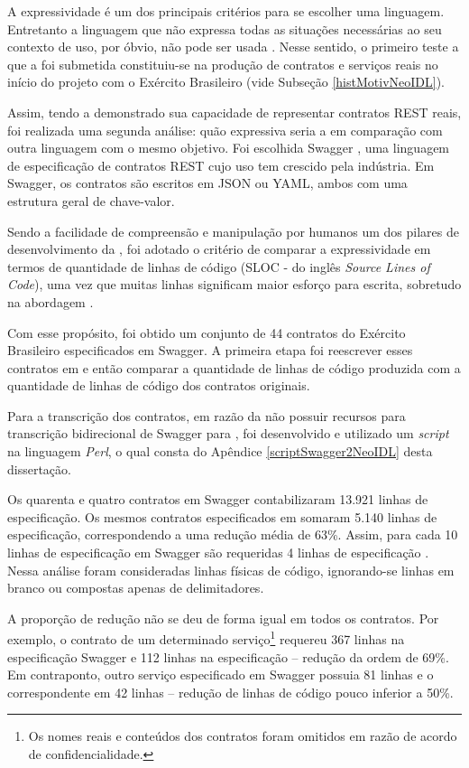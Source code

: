 A expressividade é um dos principais critérios para se escolher uma
linguagem. Entretanto a linguagem que não expressa todas as situações
necessárias ao seu contexto de uso, por óbvio, não pode ser usada
\cite{mackinlay1985expressiveness}. Nesse sentido, o primeiro teste a que a
\neoidl{} foi submetida constituiu-se na produção de contratos e serviços reais
no início do projeto com o Exército Brasileiro (vide Subseção \ref{histMotivNeoIDL}).

Assim, tendo a \neoidl{} demonstrado sua capacidade de representar contratos
REST reais, foi realizada uma segunda análise: quão expressiva seria a
\neoidl{} em comparação com outra linguagem com o mesmo objetivo. Foi escolhida
Swagger \cite{swaggerSite}, uma linguagem de especificação de contratos REST
cujo uso tem crescido pela indústria.
Em Swagger, os contratos são escritos em JSON\cite{JSon} ou YAML\cite{YAML},
ambos com uma estrutura geral de chave-valor.

Sendo a facilidade de compreensão e manipulação por humanos um dos pilares
de desenvolvimento da \neoidl{}, foi adotado o critério de comparar
a expressividade em termos de quantidade de linhas de código (SLOC - do inglês
\textit{Source Lines of Code}), uma vez que muitas linhas significam maior
esforço para escrita, sobretudo na abordagem \CtFirst{}.

Com esse propósito, foi obtido um conjunto de 44 contratos do Exército
Brasileiro especificados em Swagger. A primeira etapa foi reescrever esses
contratos em \neoidl{} e então comparar a quantidade de linhas de código
produzida com a quantidade de linhas de código dos contratos originais.

Para a
transcrição dos contratos, em razão da \neoidl{} não possuir recursos para
trans\-crição bidirecional de Swagger para \neoidl{}, foi desenvolvido
e utilizado um \textit{script} na linguagem \textit{Perl}, 
o qual consta do Apêndice \ref{scriptSwagger2NeoIDL} desta dissertação.

Os quarenta e quatro contratos em Swagger contabilizaram 13.921 linhas de
especificação. Os mesmos contratos especificados em \neoidl{} somaram 5.140
linhas de especificação, correspondendo a uma redução média de 63\%. Assim, para
cada 10 linhas de especificação em Swagger são requeridas 4 linhas de
especificação \neoidl{}. Nessa análise foram consideradas linhas físicas de
código, ignorando-se linhas em branco ou compostas apenas de delimitadores.

A proporção de redução não se deu de forma igual em todos os contratos. Por
exemplo, o contrato de um determinado serviço\footnote{Os nomes reais e
conteúdos dos contratos foram omitidos em razão de acordo de confidencialidade.}
requereu 367 linhas na especificação Swagger e 112 linhas na especificação \neoidl{} --
redução da ordem de 69\%.
Em contraponto, outro serviço especificado em Swagger possuia 81 linhas e o
correspondente em \neoidl{} 42 linhas -- redução de linhas de código pouco inferior a 50\%.

